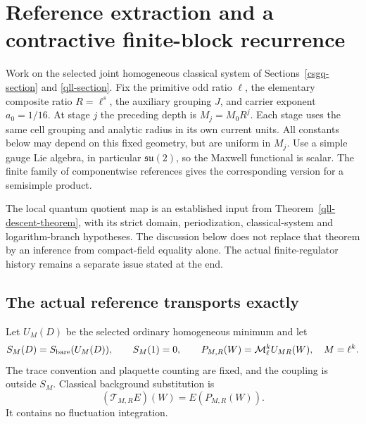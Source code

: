 \section{Reference extraction and a contractive finite-block recurrence}
\label{eqr-section}

Work on the selected joint homogeneous classical system of
Sections~\ref{csgq-section} and \ref{qll-section}. Fix the primitive
odd ratio $\ell$, the elementary composite ratio $R=\ell^s$, the
auxiliary grouping $J$, and carrier exponent $a_0=1/16$.
At stage $j$ the preceding depth is $M_j=M_0R^j$. Each stage uses
the same cell grouping and analytic radius in its own current units.
All constants below may depend on this fixed geometry, but are uniform
in $M_j$. Use a simple gauge Lie algebra, in particular
$\mathfrak{su}(2)$, so the Maxwell functional is scalar. The finite
family of componentwise references gives the corresponding version
for a semisimple product.

The local quantum quotient map is an established input from
Theorem~\ref{qll-descent-theorem}, with its strict domain, periodization,
classical-system and logarithm-branch hypotheses. The discussion below
does not replace that theorem by an inference from compact-field
equality alone. The actual finite-regulator history remains a separate
issue stated at the end.

\subsection{The actual reference transports exactly}
\label{eqr-reference-section}

Let $U_M(D)$ be the selected ordinary homogeneous minimum and let
\begin{equation}
 S_M(D)=S_{\rm bare}(U_M(D)),\qquad S_M(1)=0,
 \qquad
 P_{M,R}(W)=\mathcal M_\ell^k U_{MR}(W),\quad M=\ell^k.
 \label{eqr-reference-definition}
\end{equation}
The trace convention and plaquette counting are fixed, and the coupling
is outside $S_M$. Classical background substitution is
\[
        (\mathcal T_{M,R}E)(W)=E(P_{M,R}(W)).
\]
It contains no fluctuation integration.

